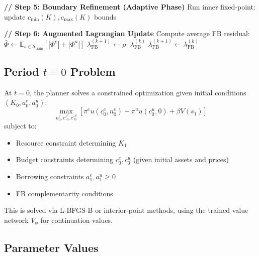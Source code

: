 \begin{algorithm}[H]
\begin{algorithmic}[1]
    \State
    \State \textbf{// Step 5: Boundary Refinement (Adaptive Phase)}
        \State Run inner fixed-point: update $c_{\min}(K), c_{\max}(K)$ bounds
    \EndIf
    
    \State
    \State \textbf{// Step 6: Augmented Lagrangian Update}
    \State Compute average FB residual: $\bar{\Phi} \gets \mathbb{E}_{s \in \mathcal{S}_{\text{train}}}[|\Phi^e| + |\Phi^u|]$
        \State $\lambda_{\text{FB}}^{(k+1)} \gets \rho \cdot \lambda_{\text{FB}}^{(k)}$ 
    \Else
        \State $\lambda_{\text{FB}}^{(k+1)} \gets \lambda_{\text{FB}}^{(k)}$ 
    \EndIf
    
\EndFor
\end{algorithmic}
\end{algorithm}


\subsection{Period $t=0$ Problem}

At $t=0$, the planner solves a constrained optimization given initial conditions $(K_0, a_0^e, a_0^u)$:
\begin{equation}
    \max_{n_0^e, c'^e_0, c'^u_0} \left[ \pi^e u(c_0^e, n_0^e) + \pi^u u(c_0^u, 0) + \beta V(s_1) \right]
\end{equation}
subject to:
\begin{itemize}
    \item Resource constraint determining $K_1$
    \item Budget constraints determining $c_0^e, c_0^u$ (given initial assets and prices)
    \item Borrowing constraints $a_1^e, a_1^u \geq 0$
    \item FB complementarity conditions
\end{itemize}

This is solved via L-BFGS-B or interior-point methods, using the trained value network $V_\phi$ for continuation values.


\subsection{Parameter Values}

